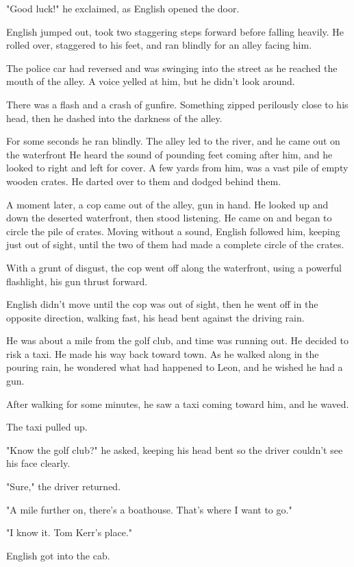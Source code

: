 \documentclass{novel}
\begin{document}
"Good luck!" he exclaimed, as English opened the door.

English jumped out, took two staggering steps forward before falling heavily. He rolled over, staggered to his feet, and ran blindly for an alley facing him.

The police car had reversed and was swinging into the street as he reached the mouth of the alley. A voice yelled at him, but he didn't look around.

There was a flash and a crash of gunfire. Something zipped perilously close to his head, then he dashed into the darkness of the alley.

For some seconds he ran blindly. The alley led to the river, and he came out on the waterfront He heard the sound of pounding feet coming after him, and he looked to right and left for cover. A few yards from him, was a vast pile of empty wooden crates. He darted over to them and dodged behind them.

A moment later, a cop came out of the alley, gun in hand. He looked up and down the deserted waterfront, then stood listening. He came on and began to circle the pile of crates. Moving without a sound, English followed him, keeping just out of sight, until the two of them had made a complete circle of the crates.

With a grunt of disgust, the cop went off along the waterfront, using a powerful flashlight, his gun thrust forward.

English didn't move until the cop was out of sight, then he went off in the opposite direction, walking fast, his head bent against the driving rain.

He was about a mile from the golf club, and time was running out. He decided to risk a taxi. He made his way back toward town. As he walked along in the pouring rain, he wondered what had happened to Leon, and he wished he had a gun.

After walking for some minutes, he saw a taxi coming toward him, and he waved.

The taxi pulled up.

"Know the golf club?" he asked, keeping his head bent so the driver couldn't see his face clearly.

"Sure," the driver returned.

"A mile further on, there's a boathouse. That's where I want to go."

"I know it. Tom Kerr's place."

English got into the cab.
\end{document}
